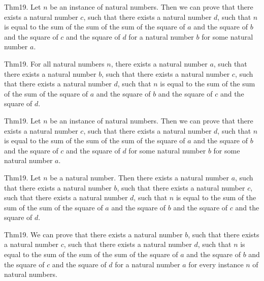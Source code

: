 \documentclass{article}
\begin{document}
Thm19. Let $n$ be an instance of natural numbers. Then we can prove that there exists a natural number $c$, such that there exists a natural number $d$, such that $n$ is equal to the sum of the sum of the sum of the square of $a$ and the square of $b$ and the square of $c$ and the square of $d$ for a natural number $b$ for some natural number $a$.

Thm19. For all natural numbers $n$, there exists a natural number $a$, such that there exists a natural number $b$, such that there exists a natural number $c$, such that there exists a natural number $d$, such that $n$ is equal to the sum of the sum of the sum of the square of $a$ and the square of $b$ and the square of $c$ and the square of $d$.

Thm19. Let $n$ be an instance of natural numbers. Then we can prove that there exists a natural number $c$, such that there exists a natural number $d$, such that $n$ is equal to the sum of the sum of the sum of the square of $a$ and the square of $b$ and the square of $c$ and the square of $d$ for some natural number $b$ for some natural number $a$.

Thm19. Let $n$ be a natural number. Then there exists a natural number $a$, such that there exists a natural number $b$, such that there exists a natural number $c$, such that there exists a natural number $d$, such that $n$ is equal to the sum of the sum of the sum of the square of $a$ and the square of $b$ and the square of $c$ and the square of $d$.

Thm19. We can prove that there exists a natural number $b$, such that there exists a natural number $c$, such that there exists a natural number $d$, such that $n$ is equal to the sum of the sum of the sum of the square of $a$ and the square of $b$ and the square of $c$ and the square of $d$ for a natural number $a$ for every instance $n$ of natural numbers.
\end{document}

